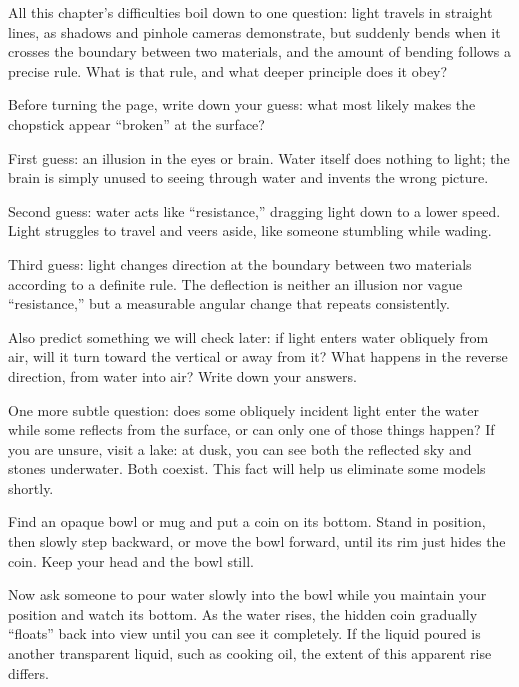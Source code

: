 \begin{mainline}
All this chapter's difficulties boil down to one question: light travels in straight lines, as shadows and pinhole cameras demonstrate, but suddenly bends when it crosses the boundary between two materials, and the amount of bending follows a precise rule. What is that rule, and what deeper principle does it obey?
\end{mainline}


Before turning the page, write down your guess: what most likely makes the chopstick appear ``broken'' at the surface?

First guess: an illusion in the eyes or brain. Water itself does nothing to light; the brain is simply unused to seeing through water and invents the wrong picture.

Second guess: water acts like ``resistance,'' dragging light down to a lower speed. Light struggles to travel and veers aside, like someone stumbling while wading.

Third guess: light changes direction at the boundary between two materials according to a definite rule. The deflection is neither an illusion nor vague ``resistance,'' but a measurable angular change that repeats consistently.

Also predict something we will check later: if light enters water obliquely from air, will it turn toward the vertical or away from it? What happens in the reverse direction, from water into air? Write down your answers.

One more subtle question: does some obliquely incident light enter the water while some reflects from the surface, or can only one of those things happen? If you are unsure, visit a lake: at dusk, you can see both the reflected sky and stones underwater. Both coexist. This fact will help us eliminate some models shortly.


\begin{experiment}
Find an opaque bowl or mug and put a coin on its bottom. Stand in position, then slowly step backward, or move the bowl forward, until its rim just hides the coin. Keep your head and the bowl still.

Now ask someone to pour water slowly into the bowl while you maintain your position and watch its bottom. As the water rises, the hidden coin gradually ``floats'' back into view until you can see it completely. If the liquid poured is another transparent liquid, such as cooking oil, the extent of this apparent rise differs.
\end{experiment}

